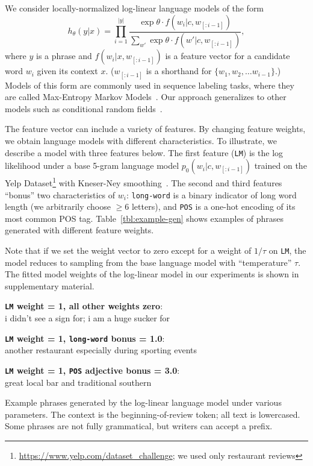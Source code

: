 \documentclass[11pt,letterpaper]{article}
\begin{document}
We consider locally-normalized log-linear language models of the form
\begin{equation}
\label{eq:rewardp}
h_\theta(y|x) = \prod_{i=1}^{|y|} \frac{\exp{\theta\cdot f(w_i|c, w_{[:i-1]})}}{\sum_{w'} \exp{\theta\cdot  f(w'|c, w_{[:i-1]})}},
\end{equation}
where $y$ is a phrase and $f(w_i|x, w_{[:i-1]})$ is a feature vector for a candidate word $w_i$ given its context $x$. ($w_{[:i-1]}$ is a shorthand for $\{w_1,w_2, \ldots w_{i-1}\}$.)
Models of this form are commonly used in sequence labeling tasks, where they are called Max-Entropy Markov Models~\cite{mccallum00memm}. Our approach generalizes to other models such as conditional random fields~\cite{lafferty01crf}.

The feature vector can include a variety of features. By changing feature weights, we obtain language models with different characteristics. To illustrate, we describe a model with three features below.
The first feature (\texttt{LM}) is the log likelihood under a base 5-gram language model $p_0(w_i|c, w_{[:i-1]})$ trained on the Yelp Dataset\footnote{\url{https://www.yelp.com/dataset_challenge}; we used only restaurant reviews} with Kneser-Ney smoothing~\cite{KenLM-Heafield-estimate}. The second and third features ``bonus'' two characteristics of $w_i$: \texttt{long-word} is a binary indicator of long word length (we arbitrarily choose $\ge{}6$ letters), and \texttt{POS} is a one-hot encoding of its most common POS tag. Table~\ref{tbl:example-gen} shows examples of phrases generated with different feature weights.

Note that if we set the weight vector to zero except for a weight of $1/\tau$ on \texttt{LM}, the model reduces to sampling from the base language model with ``temperature'' $\tau$. The fitted model weights of the log-linear model in our experiments is shown in supplementary material.


\begin{table}
{\small
\textbf{\texttt{LM} weight = 1, all other weights zero}:\\
 i didn't see a sign for; i am a huge sucker for

\textbf{\texttt{LM} weight = 1, \texttt{long-word} bonus = 1.0}:\\
another restaurant especially during sporting events

\textbf{\texttt{LM} weight = 1, \texttt{POS} adjective bonus = 3.0}:\\
great local bar and traditional southern%
}
\caption{\label{tbl:example-gen} Example phrases generated by the log-linear language model under various parameters. The context is the beginning-of-review token; all text is lowercased. Some phrases are not fully grammatical, but writers can accept a prefix.}

\end{table}
\end{document}
